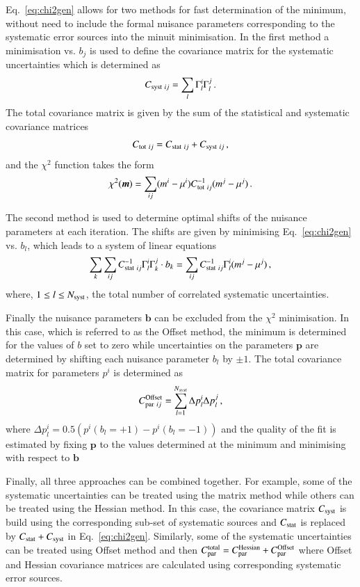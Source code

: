 \begin{description}
Eq.~\ref{eq:chi2gen} allows for two methods for fast determination
of the minimum, without need to include the formal nuisance parameters
corresponding to the systematic error sources into the minuit minimisation.
In the first method a minimisation vs. $b_j$ is used to define the covariance
matrix for the systematic uncertainties which is determined as
\begin{equation}
 C_{{\rm syst}~ij}= \sum_l \Gamma^i_l \Gamma^j_l \,.
\end{equation}
The total covariance matrix is given by the sum of the statistical and
systematic covariance matrices
\begin{equation} 
C_{{\rm tot}~ij} = C_{{\rm stat}~ij} + C_{{\rm syst}~ij}\,,
\end{equation}
and the $\chi^2$ function takes the form
\begin{equation}
  \chi^2( \boldsymbol{m}) = \sum_{ij} ( m^i - \mu^i) C^{-1}_{{\rm tot}~ij} 
( m^j - \mu^j)\,.
\end{equation}

The second method is used to determine optimal shifts of the nuisance
parameters at each iteration. The shifts are given by minimising 
Eq.~\ref{eq:chi2gen} vs. $b_l$, which leads to a system of  linear equations 
\begin{equation}
 \sum_k \sum_{ij} C^{-1}_{{\rm stat}~ij} \Gamma^i_l \Gamma^j_k \cdot b_k = \sum_{ij} C^{-1}_{{\rm stat}~ij} \Gamma^i_l (m^j - \mu^j)\,,
\end{equation}
where, $1\le l \le N_{\rm syst}$, the total number of correlated systematic uncertainties.

Finally the nuisance parameters $\boldsymbol{b}$ can be excluded from the $\chi^2$ minimisation.  
In this case, which is referred to as the Offset method, the minimum is determined for the values of $b$ set to zero
while uncertainties on the parameters $\boldsymbol{p}$ are determined by shifting each nuisance parameter $b_l$
by $\pm 1$. The total covariance matrix for parameters $p^i$ is determined as 
\begin{equation}
  C^{\rm Offset}_{ {\rm par}~ ij} = \sum_{l=1}^{N_{syst}} \Delta p^i_l \Delta p^j_l \,,
\end{equation}
where $ \Delta p^i_l = 0.5 ( p^i( b_l = +1 ) - p^i(b_l = -1))$ and the quality of the fit is estimated by 
fixing $\boldsymbol{p}$ to the values determined at the minimum and minimising with respect to $\boldsymbol{b}$

Finally, all three approaches can be combined together. For example, some of the systematic uncertainties
can be treated using the matrix method while others can be treated using the Hessian method. In this case, the
covariance matrix  $C_{\rm syst}$ is build using the corresponding sub-set of systematic sources and $C_{\rm stat}$ 
is replaced by $C_{\rm stat}+C_{\rm syst}$ in Eq.~\ref{eq:chi2gen}. Similarly, some of the systematic uncertainties
can be treated using Offset method and then $C^{\rm total}_{ {\rm par}} = C^{\rm Hessian}_{\rm par} + C^{\rm Offset}_{\rm par}$
where Offset and Hessian covariance matrices are calculated using corresponding systematic error sources.


\end{description}
